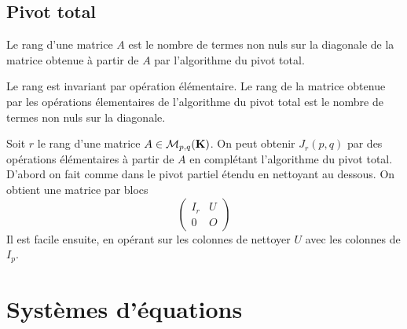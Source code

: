 \subsection{Pivot total}
\begin{prop}
 Le rang d'une matrice $A$ est le nombre de termes non nuls sur la diagonale de la matrice obtenue à partir de $A$ par l'algorithme du pivot total.
\end{prop}
\begin{demo}
 Le rang est invariant par opération élémentaire. Le rang de la matrice obtenue par les opérations élementaires de l'algorithme du pivot total est le nombre de termes non nuls sur la diagonale.
\end{demo}
\begin{rem}
 Soit $r$ le rang d'une matrice $A\in \mathcal{M}_{p,q}(\mathbf{K})$. On peut obtenir $J_r(p,q)$ par des opérations élémentaires à partir de $A$ en complétant l'algorithme du pivot total. D'abord on fait comme dans le pivot partiel étendu en nettoyant au dessous. On obtient une matrice par blocs
 \[
  \begin{pmatrix}
   I_r & U \\ 0 & O
  \end{pmatrix}
 \]
Il est facile ensuite, en opérant sur les colonnes de nettoyer $U$ avec les colonnes de $I_p$.
\end{rem}

\section{Systèmes d'équations}
